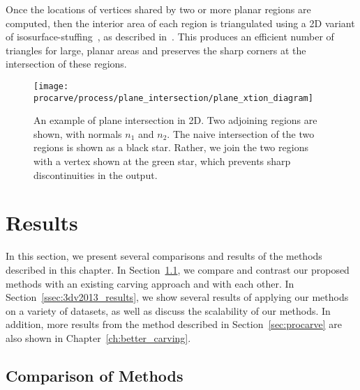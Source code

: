 \documentclass[12pt,onecolumn,oneside]{book}
\begin{document}
Once the locations of vertices shared by two or more planar regions are computed, then the interior area of each region is triangulated using a 2D variant of isosurface-stuffing~\cite{Isostuffing}, as described in~\cite{Turner13}.  This produces an efficient number of triangles for large, planar areas and preserves the sharp corners at the intersection of these regions. 

\begin{figure}
	\centerline{\texttt{[image: procarve/process/plane\_intersection/plane\_xtion\_diagram]}}
	\caption[Computing intersection point for planar regions.]{An example of plane intersection in 2D.  Two adjoining regions are shown, with normals $n_1$ and $n_2$.  The naive intersection of the two regions is shown as a black star.  Rather, we join the two regions with a vertex shown at the green star, which prevents sharp discontinuities in the output.}
	\label{fig:plane_xtion}
\end{figure}

\section{Results}
\label{sec:carving_results}

In this section, we present several comparisons and results of the methods described in this chapter.  In Section~\ref{ssec:compare_3dv2013_procarve}, we compare and contrast our proposed methods with an existing carving approach and with each other.  In Section~\ref{ssec:3dv2013_results}, we show several results of applying our methods on a variety of datasets, as well as discuss the scalability of our methods.  In addition, more results from the method described in Section~\ref{sec:procarve} are also shown in Chapter~\ref{ch:better_carving}.

\subsection{Comparison of Methods}
\label{ssec:compare_3dv2013_procarve}
\end{document}
